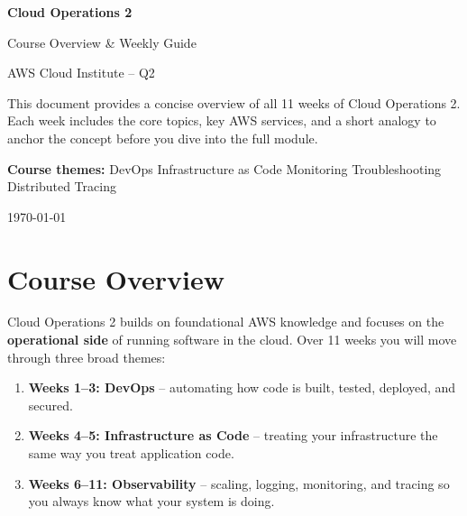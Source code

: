 \documentclass[12pt,a4paper]{article}
\begin{document}
\begin{titlepage}
  \centering
  \vspace*{3cm}
  {\fontsize{34}{42}\selectfont\bfseries\color{awsblue}Cloud Operations 2\par}
  \vspace{0.5cm}
  {\fontsize{18}{26}\selectfont\color{awsorange}Course Overview \& Weekly Guide\par}
  \vspace{0.5cm}
  {\large AWS Cloud Institute -- Q2\par}
  \vspace{2.5cm}
  \begin{tcolorbox}[
    colback=lightgray, colframe=awsblue, width=0.85\textwidth, arc=6pt,
    title={\textbf{About This Document}},
    fonttitle=\color{white}, colbacktitle=awsblue]
  This document provides a concise overview of all 11 weeks of Cloud Operations 2.
  Each week includes the core topics, key AWS services, and a short analogy to anchor
  the concept before you dive into the full module.

  \vspace{0.4cm}
  \textbf{Course themes:} DevOps \textbullet{} Infrastructure as Code \textbullet{}
  Monitoring \textbullet{} Troubleshooting \textbullet{} Distributed Tracing
  \end{tcolorbox}
  \vspace{2cm}
  {\large \today\par}
\end{titlepage}

\tableofcontents
\newpage

\section*{Course Overview}

Cloud Operations 2 builds on foundational AWS knowledge and focuses on the
\textbf{operational side} of running software in the cloud.
Over 11 weeks you will move through three broad themes:

\begin{enumerate}
  \item \textbf{Weeks 1--3: DevOps} -- automating how code is built, tested,
        deployed, and secured.
  \item \textbf{Weeks 4--5: Infrastructure as Code} -- treating your infrastructure
        the same way you treat application code.
  \item \textbf{Weeks 6--11: Observability} -- scaling, logging, monitoring, and
        tracing so you always know what your system is doing.
\end{enumerate}
\end{document}
